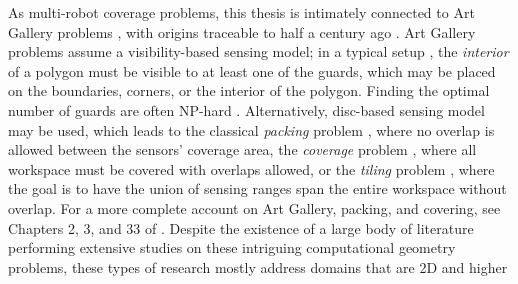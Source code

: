 As multi-robot coverage problems, this thesis is intimately connected to Art 
Gallery problems \cite{o1987art,shermer1992recent}, with origins traceable 
to half a century ago \cite{klee1969every}. Art Gallery problems assume 
a visibility-based \cite{lozano1979algorithm} sensing model; in a typical 
setup \cite{o1987art}, the {\em interior} of a polygon must be visible to at 
least one of the guards, which may be placed on the boundaries, corners, 
or the interior of the polygon. Finding the optimal number of guards are 
often NP-hard \cite{lee1986computational}. Alternatively, disc-based sensing 
model may be used, which leads to the classical {\em packing} problem 
\cite{thue1910dichteste,hales2005proof}, where no overlap is allowed between 
the sensors' coverage area, the {\em coverage} problem 
\cite{drezner1995facility,cortes2004coverage,pavone2009equitable,martinez2010distributed,pierson2017adapting}, 
where all 
workspace must be covered with overlaps allowed, or the {\em tiling} problem 
\cite{kershner1968paving}, where the goal is to have the union of sensing
ranges span the entire workspace without overlap. For a more complete 
account on Art Gallery, packing, and covering, see Chapters 2, 3, and 33 of
\cite{toth2017handbook}. Despite the existence of a large body of literature 
performing extensive studies on these intriguing computational geometry 
problems, these types of research mostly address domains that are 2D and 
higher




